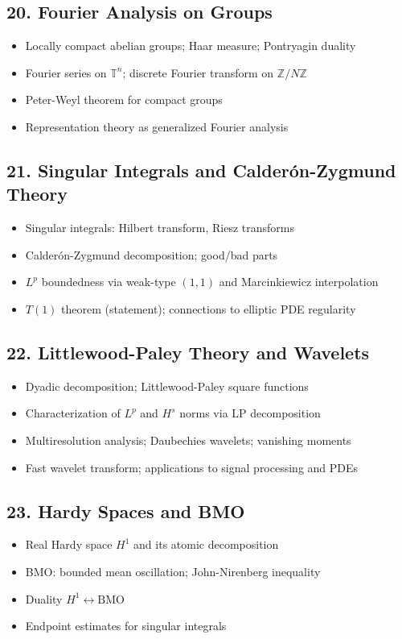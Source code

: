 \subsection{20. Fourier Analysis on Groups}
\begin{itemize}
\item Locally compact abelian groups; Haar measure; Pontryagin duality
\item Fourier series on $\mathbb{T}^n$; discrete Fourier transform on $\mathbb{Z}/N\mathbb{Z}$
\item Peter-Weyl theorem for compact groups
\item Representation theory as generalized Fourier analysis
\end{itemize}

\subsection{21. Singular Integrals and Calder\'on-Zygmund Theory}
\begin{itemize}
\item Singular integrals: Hilbert transform, Riesz transforms
\item Calder\'on-Zygmund decomposition; good/bad parts
\item $L^p$ boundedness via weak-type $(1,1)$ and Marcinkiewicz interpolation
\item $T(1)$ theorem (statement); connections to elliptic PDE regularity
\end{itemize}

\subsection{22. Littlewood-Paley Theory and Wavelets}
\begin{itemize}
\item Dyadic decomposition; Littlewood-Paley square functions
\item Characterization of $L^p$ and $H^s$ norms via LP decomposition
\item Multiresolution analysis; Daubechies wavelets; vanishing moments
\item Fast wavelet transform; applications to signal processing and PDEs
\end{itemize}

\subsection{23. Hardy Spaces and BMO}
\begin{itemize}
\item Real Hardy space $H^1$ and its atomic decomposition
\item BMO: bounded mean oscillation; John-Nirenberg inequality
\item Duality $H^1 \leftrightarrow \mathrm{BMO}$
\item Endpoint estimates for singular integrals
\end{itemize}


